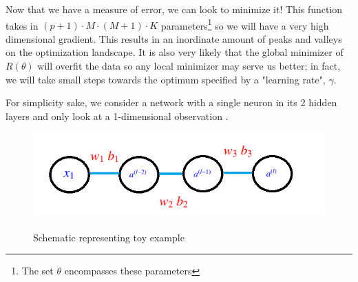 \documentclass{article}
\begin{document}
\noindent Now that we have a measure of error, we can look to minimize it! This function takes in $(p + 1)\cdot M\cdot (M + 1)\cdot K$ parameters\footnote{The set $\theta$ encompasses these parameters} so we will have a very high dimensional gradient. This results in an inordinate amount of peaks and valleys on the optimization landscape. It is also very likely that the global minimizer of $R(\theta)$ will overfit the data so any local minimizer may serve us better; in fact, we will take small steps towards the optimum specified by a "learning rate", $\gamma$.

\noindent For simplicity sake, we consider a network with a single neuron in its 2 hidden layers and only look at a 1-dimensional observation \cite{3blue1brown_2017}.

\begin{figure}[h!]
  \centering
  \includegraphics[scale = 0.7]{schema.png}
  \label{fig:schema}
  \caption{Schematic representing toy example}
\end{figure}
\end{document}
